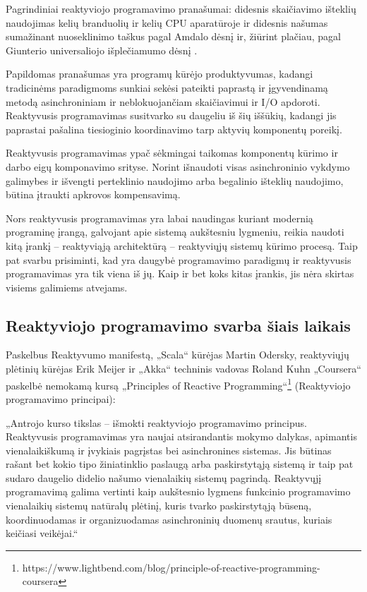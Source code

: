 Pagrindiniai reaktyviojo programavimo pranašumai: didesnis skaičiavimo išteklių naudojimas kelių branduolių ir kelių CPU aparatūroje ir didesnis našumas sumažinant nuoseklinimo taškus pagal Amdalo dėsnį \cite{Rodgers:1985:IMS:327070.327215} ir, žiūrint plačiau, pagal Giunterio universaliojo išplečiamumo dėsnį \cite{opac-b1118020}.

Papildomas pranašumas yra programų kūrėjo produktyvumas, kadangi tradicinėms paradigmoms sunkiai sekėsi pateikti paprastą ir įgyvendinamą metodą asinchroniniam ir neblokuojančiam skaičiavimui ir I/O apdoroti. Reaktyvusis programavimas susitvarko su daugeliu iš šių iššūkių, kadangi jis paprastai pašalina tiesioginio koordinavimo tarp aktyvių komponentų poreikį.

Reaktyvusis programavimas ypač sėkmingai taikomas komponentų kūrimo ir darbo eigų komponavimo srityse. Norint išnaudoti visas asinchroninio vykdymo galimybes ir išvengti perteklinio naudojimo arba begalinio išteklių naudojimo, būtina įtraukti apkrovos kompensavimą.

Nors reaktyvusis programavimas yra labai naudingas kuriant modernią programinę įrangą, galvojant apie sistemą aukštesniu lygmeniu, reikia naudoti kitą įrankį – reaktyviąją architektūrą – reaktyviųjų sistemų kūrimo procesą. Taip pat svarbu prisiminti, kad yra daugybė programavimo paradigmų ir reaktyvusis programavimas yra tik viena iš jų. Kaip ir bet koks kitas įrankis, jis nėra skirtas visiems galimiems atvejams.

\subsection{Reaktyviojo programavimo svarba šiais laikais}

Paskelbus Reaktyvumo manifestą, „Scala“ kūrėjas Martin Odersky, reaktyviųjų plėtinių kūrėjas Erik Meijer ir „Akka“ techninis vadovas Roland Kuhn „Coursera“ paskelbė nemokamą kursą „Principles of Reactive Programming“\footnote{https://www.lightbend.com/blog/principle-of-reactive-programming-coursera} (Reaktyviojo programavimo principai):

„Antrojo kurso tikslas – išmokti reaktyviojo programavimo principus. Reaktyvusis programavimas yra naujai atsirandantis mokymo dalykas, apimantis vienalaikiškumą ir įvykiais pagrįstas bei asinchronines sistemas. Jis būtinas rašant bet kokio tipo žiniatinklio paslaugą arba paskirstytąją sistemą ir taip pat sudaro daugelio didelio našumo vienalaikių sistemų pagrindą. Reaktyvųjį programavimą galima vertinti kaip aukštesnio lygmens funkcinio programavimo vienalaikių sistemų natūralų plėtinį, kuris tvarko paskirstytąją būseną, koordinuodamas ir organizuodamas asinchroninių duomenų srautus, kuriais keičiasi veikėjai.“

